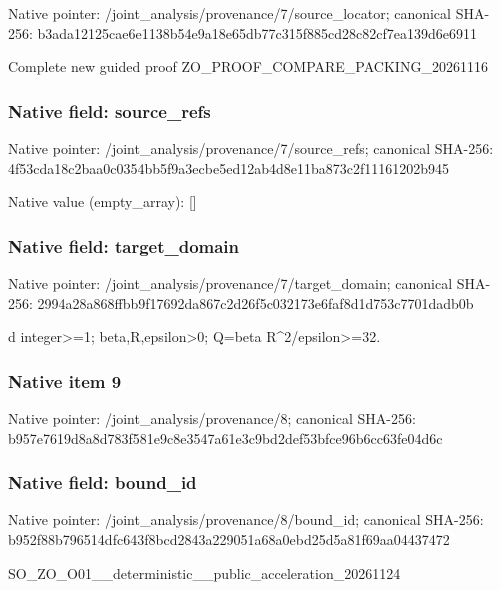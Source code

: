 \documentclass[10pt,a4paper]{article}
\begin{document}
Native pointer: /joint\_analysis/provenan\allowbreak{}ce/7/source\_locator; canonical SHA-256: b3ada12125cae6e1138b54e9\allowbreak{}a18e65db77c315f885cd28c8\allowbreak{}2cf7ea139d6e6911


Complete new guided proof ZO\_PROOF\_COMPARE\_PACKING\_20261116


\subsubsection{Native field: source\_refs}


Native pointer: /joint\_analysis/provenan\allowbreak{}ce/7/source\_refs; canonical SHA-256: 4f53cda18c2baa0c0354bb5f\allowbreak{}9a3ecbe5ed12ab4d8e11ba87\allowbreak{}3c2f11161202b945



Native value (empty\_array): []



\subsubsection{Native field: target\_domain}


Native pointer: /joint\_analysis/provenan\allowbreak{}ce/7/target\_domain; canonical SHA-256: 2994a28a868ffbb9f17692da\allowbreak{}867c2d26f5c032173e6faf8d\allowbreak{}1d753c7701dadb0b


d integer>=1; beta,R,epsilon>0; Q=beta R\textasciicircum{}2/epsilon>=32.


\subsubsection{Native item 9}


Native pointer: /joint\_analysis/provenance/8; canonical SHA-256: b957e7619d8a8d783f581e9c\allowbreak{}8e3547a61e3c9bd2def53bfc\allowbreak{}e96b6cc63fe04d6c



\subsubsection{Native field: bound\_id}


Native pointer: /joint\_analysis/provenance/8/bound\_id; canonical SHA-256: b952f88b796514dfc643f8bc\allowbreak{}d2843a229051a68a0ebd25d5\allowbreak{}a81f69aa04437472


SO\_ZO\_O01\_\_deterministic\allowbreak{}\_\_public\_acceleration\_20\allowbreak{}261124
\end{document}
